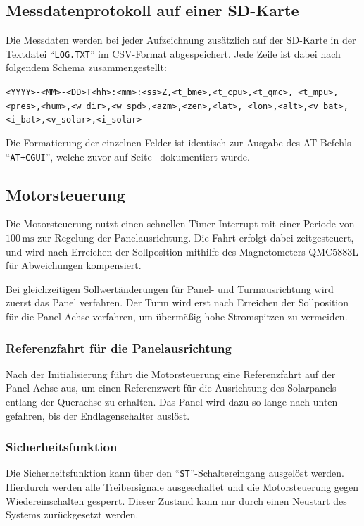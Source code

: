     \subsection{Messdatenprotokoll auf einer SD-Karte}\label{ssec:SD_Card}
        Die Messdaten werden bei jeder Aufzeichnung zusätzlich auf der SD-Karte in der Textdatei ``\texttt{LOG.TXT}'' im CSV-Format abgespeichert. Jede Zeile ist dabei nach folgendem Schema zusammengestellt:
        \begin{center}
            \texttt{<YYYY>-<MM>-<DD>T<hh>:<mm>:<ss>Z,<t\_bme>,<t\_cpu>,<t\_qmc>, <t\_mpu>,<pres>,<hum>,<w\_dir>,<w\_spd>,<azm>,<zen>,<lat>, <lon>,<alt>,<v\_bat>,<i\_bat>,<v\_solar>,<i\_solar>}
        \end{center}
    
        Die Formatierung der einzelnen Felder ist identisch zur Ausgabe des AT-Befehls ``\texttt{AT+CGUI}'', welche zuvor auf Seite~\pageref{tab:at_cgui} dokumentiert wurde.
        
    \subsection{Motorsteuerung}
        Die Motorsteuerung nutzt einen schnellen Timer-Interrupt mit einer Periode von $100\,\mathrm{ms}$ zur Regelung der Panelausrichtung. Die Fahrt erfolgt dabei zeitgesteuert, und wird nach Erreichen der Sollposition mithilfe des Magnetometers QMC5883L für Abweichungen kompensiert.
        
        Bei gleichzeitigen Sollwertänderungen für Panel- und Turmausrichtung wird zuerst das Panel verfahren. Der Turm wird erst nach Erreichen der Sollposition für die Panel-Achse verfahren, um übermäßig hohe Stromspitzen zu vermeiden.
        
        \subsubsection{Referenzfahrt für die Panelausrichtung}
        Nach der Initialisierung führt die Motorsteuerung eine Referenzfahrt auf der Panel-Achse aus, um einen Referenzwert für die Ausrichtung des Solarpanels entlang der Querachse zu erhalten. Das Panel wird dazu so lange nach unten gefahren, bis der Endlagenschalter auslöst.
        
        \subsubsection{Sicherheitsfunktion}
        Die Sicherheitsfunktion kann über den ``\texttt{ST}''-Schaltereingang ausgelöst werden. Hierdurch werden alle Treibersignale ausgeschaltet und die Motorsteuerung gegen Wiedereinschalten gesperrt. Dieser Zustand kann nur durch einen Neustart des Systems zurückgesetzt werden.
               
